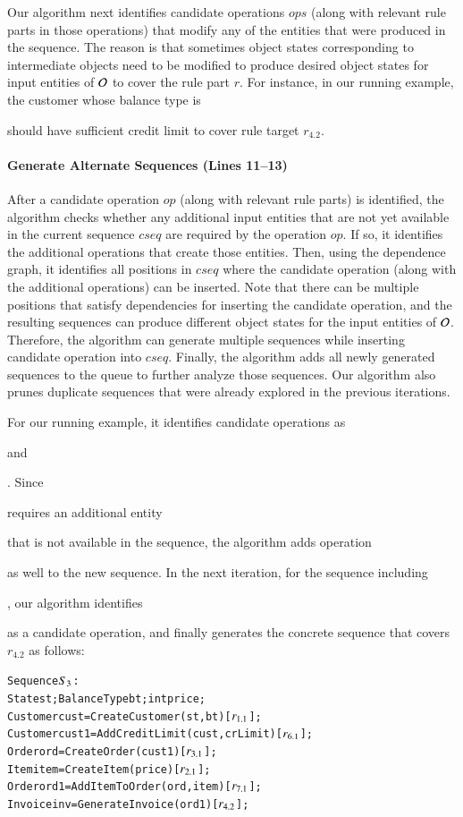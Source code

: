 Our algorithm next identifies candidate operations $ops$ (along with relevant
rule parts in those operations) that modify any of the entities
that were produced in the sequence. The reason is that sometimes object states 
corresponding to intermediate objects need to be modified to produce desired object states
for input entities of ${\cal O}$ to cover the rule part $r$. 
For instance, in our running example, the customer whose balance type
is \subject{Credit} should have sufficient credit limit to cover rule target $r_{4.2}$.

\paragraph*{Generate Alternate Sequences (Lines 11--13)} After a candidate
operation $op$ (along with relevant rule parts) is identified, the algorithm checks
whether any additional input entities that are not yet available in the current
sequence $cseq$ are required by the operation $op$.  If so, it identifies the
additional operations that create those entities. Then, using the dependence
graph, it identifies all positions in $cseq$ where the candidate operation
(along with the additional operations) can be inserted. Note that there can be
multiple positions that satisfy dependencies for inserting the candidate
operation, and the resulting sequences can produce different object states for
the input entities of ${\cal O}$.  Therefore, the algorithm can generate
multiple sequences while inserting candidate operation into $cseq$. Finally, the
algorithm adds all newly generated sequences to the queue to further analyze
those sequences. Our algorithm also prunes duplicate sequences that were already
explored in the previous iterations.

For our running example, it identifies candidate operations as
\subject{AddItemToOrder} and \subject{AddCreditLimit}. Since
\subject{AddItemToOrder} requires an additional entity \subject{Item} that is
not available in the sequence, the algorithm adds operation \subject{CreateItem}
as well to the new sequence.  In the next iteration, for the sequence including
\subject{AddCreditLimit}, our algorithm identifies \subject{AddItemToOrder} as a
candidate operation, and finally generates the concrete sequence that covers
$r_{4.2}$ as follows:

\vspace*{-4pt}
{\scriptsize
\begin{alltt}
 Sequence \(S\sb{3}\):
 State st; BalanceType bt; int price;
 Customer cust = CreateCustomer(st, bt) [\(r\sb{1.1}\)];
 Customer cust1 = AddCreditLimit(cust, crLimit) [\(r\sb{6.1}\)];
 Order ord = CreateOrder(cust1) [\(r\sb{3.1}\)];
 Item item = CreateItem(price) [\(r\sb{2.1}\)];
 Order ord1 = AddItemToOrder(ord, item) [\(r\sb{7.1}\)];
 Invoice inv = GenerateInvoice(ord1) [\(r\sb{4.2}\)];  
\end{alltt}
}
\vspace*{-5pt}


